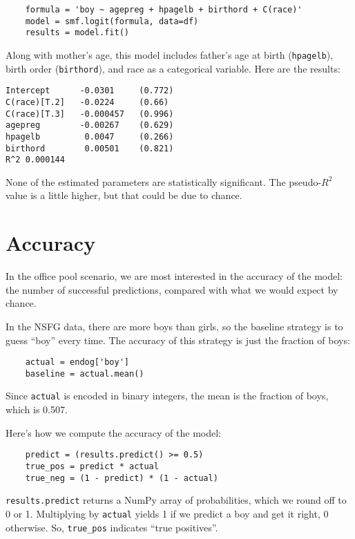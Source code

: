 \begin{verbatim}
    formula = 'boy ~ agepreg + hpagelb + birthord + C(race)'
    model = smf.logit(formula, data=df)
    results = model.fit()
\end{verbatim}

Along with mother's age, this model includes father's age at
birth ({\tt hpagelb}), birth order ({\tt birthord}), and
race as a categorical variable.  Here are the results:

\begin{verbatim}
Intercept      -0.0301     (0.772)
C(race)[T.2]   -0.0224     (0.66)
C(race)[T.3]   -0.000457   (0.996)
agepreg        -0.00267    (0.629)
hpagelb         0.0047     (0.266)
birthord        0.00501    (0.821)
R^2 0.000144
\end{verbatim}

None of the estimated parameters are statistically significant.  The
pseudo-$R^2$ value is a little higher, but that could be due to
chance.
   


\section{Accuracy}
\label{accuracy}

In the office pool scenario,
we are most interested in the accuracy of the model:
the number of successful predictions, compared with what we would
expect by chance.

In the NSFG data, there are more boys than girls, so the baseline
strategy is to guess ``boy'' every time.  The accuracy of this
strategy is just the fraction of boys:

\begin{verbatim}
    actual = endog['boy']
    baseline = actual.mean()
\end{verbatim}

Since {\tt actual} is encoded in binary integers, the mean is the
fraction of boys, which is 0.507.

Here's how we compute the accuracy of the model:

\begin{verbatim}
    predict = (results.predict() >= 0.5)
    true_pos = predict * actual
    true_neg = (1 - predict) * (1 - actual)
\end{verbatim}

{\tt results.predict} returns a NumPy array of probabilities, which we
round off to 0 or 1.  Multiplying by {\tt actual}
yields 1 if we predict a boy and get it right, 0 otherwise.  So,
\verb"true_pos" indicates ``true positives''.

